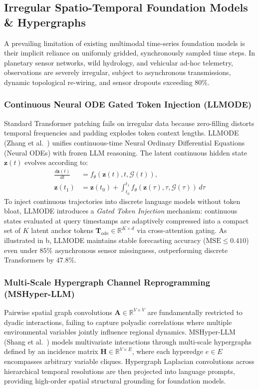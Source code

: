 \subsection{Irregular Spatio-Temporal Foundation Models \& Hypergraphs}
\label{sec:irregular_hypergraphs}
A prevailing limitation of existing multimodal time-series foundation models is their implicit reliance on uniformly gridded, synchronously sampled time steps. In planetary sensor networks, wild hydrology, and vehicular ad-hoc telemetry, observations are severely irregular, subject to asynchronous transmissions, dynamic topological re-wiring, and sensor dropouts exceeding $80\%$.

\subsubsection{Continuous Neural ODE Gated Token Injection (LLMODE)}
Standard Transformer patching fails on irregular data because zero-filling distorts temporal frequencies and padding explodes token context lengths. LLMODE (Zhang et al.~\cite{Zhang2026LLMODE}) unifies continuous-time Neural Ordinary Differential Equations (Neural ODEs) with frozen LLM reasoning. The latent continuous hidden state $\mathbf{z}(t)$ evolves according to:
\begin{equation}
\begin{aligned}
    \frac{d\mathbf{z}(t)}{dt} &= f_\theta\left( \mathbf{z}(t), t, \mathcal{G}(t) \right), \\
    \mathbf{z}(t_1) &= \mathbf{z}(t_0) + \int_{t_0}^{t_1} f_\theta(\mathbf{z}(\tau), \tau, \mathcal{G}(\tau)) \, d\tau
\end{aligned}
\end{equation}
To inject continuous trajectories into discrete language models without token bloat, LLMODE introduces a \emph{Gated Token Injection} mechanism: continuous states evaluated at query timestamps are adaptively compressed into a compact set of $K$ latent anchor tokens $\mathbf{T}_{\text{ode}} \in \mathbb{R}^{K \times d}$ via cross-attention gating. As illustrated in b, LLMODE maintains stable forecasting accuracy ($\text{MSE} \le 0.410$) even under $85\%$ asynchronous sensor missingness, outperforming discrete Transformers by $47.8\%$.

\subsubsection{Multi-Scale Hypergraph Channel Reprogramming (MSHyper-LLM)}
Pairwise spatial graph convolutions $\mathbf{A} \in \mathbb{R}^{V \times V}$ are fundamentally restricted to dyadic interactions, failing to capture polyadic correlations where multiple environmental variables jointly influence regional dynamics. MSHyper-LLM (Shang et al.~\cite{Shang2026MSHyperLLM}) models multivariate interactions through multi-scale hypergraphs defined by an incidence matrix $\mathbf{H} \in \mathbb{R}^{V \times E}$, where each hyperedge $e \in E$ encompasses arbitrary variable cliques. Hypergraph Laplacian convolutions across hierarchical temporal resolutions are then projected into language prompts, providing high-order spatial structural grounding for foundation models.


